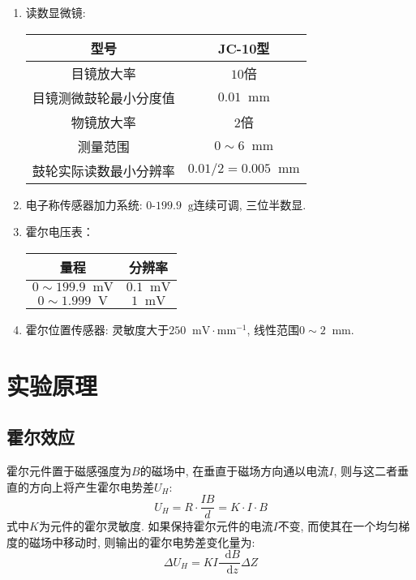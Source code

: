 \documentclass[11pt]{article}
\newcommand*{\unit}[1]{\mathop{}\!\mathrm{#1}}
\newcommand*{\dif}{\mathop{}\!\mathrm{d}}%
\begin{document}
\begin{enumerate}

    \item 读数显微镜: 
    
    \begin{tabular}{|c|c|}
        \hline
        型号    & JC-10型   \\
        \hline
        目镜放大率  & $10$倍 \\
        \hline
        目镜测微鼓轮最小分度值  & $0.01\unit{mm}$    \\
        \hline
        物镜放大率  & $2$倍  \\
        \hline
        测量范围    & $0\sim 6\unit{mm}$    \\
        \hline
        鼓轮实际读数最小分辨率  & $0.01/2=0.005\unit{mm}$    \\
        \hline
    \end{tabular}

    \item 电子称传感器加力系统: $0$-$199.9\unit{g}$连续可调, 三位半数显. 
    
    \item 霍尔电压表： 
    
    \begin{tabular}{|c|c|}
        \hline
        量程 & 分辨率  \\
        \hline
        $0\sim 199.9\unit{mV}$ & $0.1\unit{mV}$ \\
        \hline
        $0\sim 1.999\unit{V}$ & $1\unit{mV}$ \\
        \hline
    \end{tabular}

    \item 霍尔位置传感器: 灵敏度大于$250\unit{mV \cdot mm^{-1}}$, 线性范围$0\sim 2 \unit{mm}$. 
    
\end{enumerate}

\section{实验原理}

\subsection{霍尔效应}

霍尔元件置于磁感强度为$B$的磁场中, 在垂直于磁场方向通以电流$I$, 则与这二者垂直的方向上将产生霍尔电势差$U_H$: 
\[
    U_{H} = R\cdot\frac{IB}{d} = K\cdot I\cdot B
\]
式中$K$为元件的霍尔灵敏度. 如果保持霍尔元件的电流$I$不变, 而使其在一个均匀梯度的磁场中移动时, 则输出的霍尔电势差变化量为: 
\[
    \Delta U_H = KI\frac{\dif B}{\dif z}\Delta Z
\]
\end{document}
